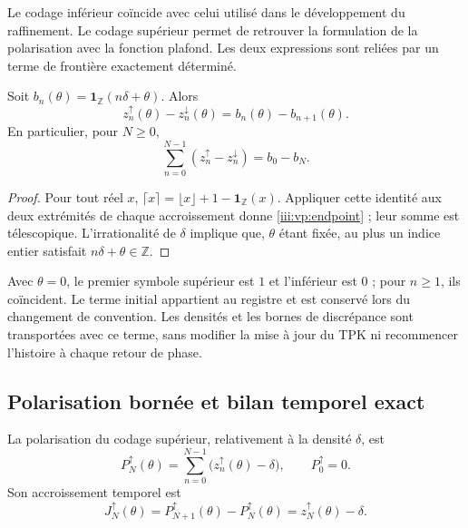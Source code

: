 Le codage inférieur coïncide avec celui utilisé dans le développement
du raffinement. Le codage supérieur permet de retrouver la formulation de la
polarisation avec la fonction plafond. Les deux expressions sont reliées par
un terme de frontière exactement déterminé.

\begin{proposition}
Soit $b_n(\theta)=\mathbf1_{\mathbb Z}(n\delta+\theta)$. Alors
\begin{equation}
 z_n^{\uparrow}(\theta)-z_n^{\downarrow}(\theta)
 =b_n(\theta)-b_{n+1}(\theta).
 \label{iii:vp:endpoint}
\end{equation}
En particulier, pour $N\geq0$,
\[
 \sum_{n=0}^{N-1}(z_n^{\uparrow}-z_n^{\downarrow})
 =b_0-b_N.
\]
\end{proposition}
\begin{proof}
Pour tout réel $x$, $\lceil x\rceil=\lfloor x\rfloor+1-
\mathbf1_{\mathbb Z}(x)$. Appliquer cette identité aux deux extrémités
de chaque accroissement donne \eqref{iii:vp:endpoint} ; leur somme est télescopique.
L’irrationalité de $\delta$ implique que, $\theta$ étant fixée, au plus
un indice entier satisfait $n\delta+\theta\in\mathbb Z$.
\end{proof}

Avec $\theta=0$, le premier symbole supérieur est $1$ et l'inférieur est $0$ ; pour $n\geq1$, ils coïncident. Le terme initial appartient au registre et est conservé lors du changement de convention. Les densités et les bornes de discrépance sont transportées avec ce terme, sans modifier la mise à jour du TPK ni recommencer l'histoire à chaque retour de phase.

\subsection{Polarisation bornée et bilan temporel exact}

\begin{definition}
La polarisation du codage supérieur, relativement à la densité
$\delta$, est
\begin{equation}
 P_N^{\uparrow}(\theta)
 =\sum_{n=0}^{N-1}\bigl(z_n^{\uparrow}(\theta)-\delta\bigr),
 \qquad P_0^{\uparrow}=0.
 \label{iii:vp:polarization}
\end{equation}
Son accroissement temporel est
\begin{equation}
 J_N^{\uparrow}(\theta)
 =P_{N+1}^{\uparrow}(\theta)-P_N^{\uparrow}(\theta)
 =z_N^{\uparrow}(\theta)-\delta.
 \label{iii:vp:current}
\end{equation}
\end{definition}

